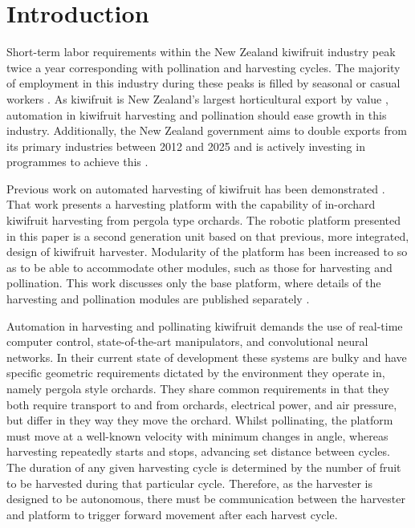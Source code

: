 \documentclass[preprint,authoryear,12pt]{elsarticle}
\begin{document}
\begin{frontmatter}
\begin{keyword}


\end{keyword}

\end{frontmatter}


\section{Introduction}
\label{sect:intro}
    Short-term labor requirements within the New Zealand kiwifruit industry peak twice a year corresponding with pollination and harvesting cycles.
    The majority of employment in this industry during these peaks is filled by seasonal or casual workers \citep{Timmins2009}.
    As kiwifruit is New Zealand's largest horticultural export by value \citep{StatisticsNewZealand2015}, automation in kiwifruit harvesting and pollination should ease growth in this industry.
    Additionally, the New Zealand government aims to double exports from its primary industries between 2012 and 2025 and is actively investing in programmes to achieve this \citep{MinistryPrimaryIndustries2015}.

    Previous work on automated harvesting of kiwifruit has been demonstrated \citep{Scarfe2012,scarfe2009}.
    That work presents a harvesting platform with the capability of in-orchard kiwifruit harvesting from pergola type orchards.
    The robotic platform presented in this paper is a second generation unit based on that previous, more integrated, design of kiwifruit harvester.
    Modularity of the platform has been increased to so as to be able to accommodate other modules, such as those for harvesting and pollination.
    This work discusses only the base platform, where details of the harvesting and pollination modules are published separately \citep{williams2017,Seabright2017}.

    Automation in harvesting and pollinating kiwifruit demands the use of real-time computer control, state-of-the-art manipulators, and convolutional neural networks.
    In their current state of development these systems are bulky and have specific geometric requirements dictated by the environment they operate in, namely pergola style orchards.
    They share common requirements in that they both require transport to and from orchards, electrical power, and air pressure, but differ in they way they move the orchard.
    Whilst pollinating, the platform must move at a well-known velocity with minimum changes in angle, whereas harvesting repeatedly starts and stops, advancing set distance between cycles.
    The duration of any given harvesting cycle is determined by the number of fruit to be harvested during that particular cycle.
    Therefore, as the harvester is designed to be autonomous, there must be communication between the harvester and platform to trigger forward movement after each harvest cycle.
\end{document}

